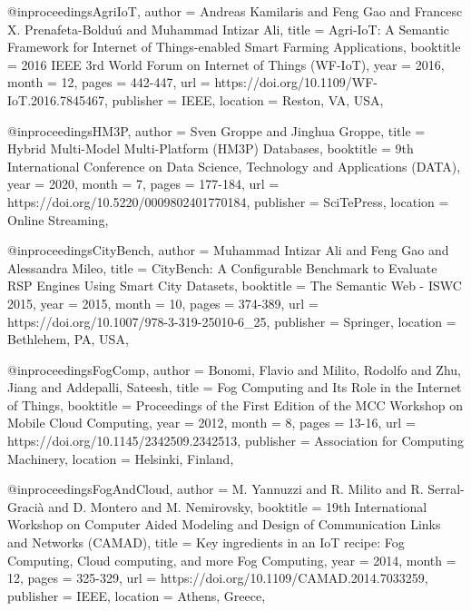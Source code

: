 \documentclass[english,version-2019-11]{uzl-thesis}
\begin{document}
\begin{bibtex-entries}


@inproceedings{AgriIoT,
    author      = {Andreas Kamilaris and Feng Gao and Francesc X. Prenafeta-Boldu\'{u} and Muhammad Intizar Ali},
    title       = {Agri-IoT: A Semantic Framework for Internet of Things-enabled Smart Farming Applications},
    booktitle   = {2016 IEEE 3rd World Forum on Internet of Things (WF-IoT)}, 
    year        = {2016},
    month       = {12},
    pages       = {442-447},
    url         = {https://doi.org/10.1109/WF-IoT.2016.7845467},
    publisher   = {IEEE},
    location    = {Reston, VA, USA},
}    
    
@inproceedings{HM3P,
    author      = {Sven Groppe and Jinghua Groppe},
    title       = {Hybrid Multi-Model Multi-Platform (HM3P) Databases},
    booktitle   = {9th International Conference on Data Science, Technology and Applications ({DATA})},
    year        = {2020},
    month       = {7},
    pages       = {177-184},
    url         = {https://doi.org/10.5220/0009802401770184},
    publisher   = {SciTePress},
    location    = {Online Streaming},
}

@inproceedings{CityBench,
    author      = {Muhammad Intizar Ali and Feng Gao and Alessandra Mileo},
    title       = {CityBench: A Configurable Benchmark to Evaluate RSP Engines Using Smart City Datasets},
    booktitle   = {The Semantic Web - ISWC 2015},
    year        = {2015},
    month       = {10},
    pages       = {374-389},
    url         = {https://doi.org/10.1007/978-3-319-25010-6_25},
    publisher   = {Springer},
    location    = {Bethlehem, PA, USA},
}

@inproceedings{FogComp,
    author      = {Bonomi, Flavio and Milito, Rodolfo and Zhu, Jiang and Addepalli, Sateesh},
    title       = {Fog Computing and Its Role in the Internet of Things},
    booktitle   = {Proceedings of the First Edition of the MCC Workshop on Mobile Cloud Computing},
    year        = {2012},
    month       = {8},
    pages       = {13-16},
    url         = {https://doi.org/10.1145/2342509.2342513},
    publisher   = {Association for Computing Machinery},
    location    = {Helsinki, Finland},
}

@inproceedings{FogAndCloud,
    author      = {M. {Yannuzzi} and R. {Milito} and R. {Serral-Gracià} and D. {Montero} and M. {Nemirovsky}},
    booktitle   = {19th International Workshop on Computer Aided Modeling and Design of Communication Links and Networks (CAMAD)},
    title       = {Key ingredients in an IoT recipe: Fog Computing, Cloud computing, and more Fog Computing},
    year        = {2014},
    month       = {12},
    pages       = {325-329},
    url         = {https://doi.org/10.1109/CAMAD.2014.7033259},
    publisher   = {IEEE},
    location    = {Athens, Greece},
}


\end{bibtex-entries}
\end{document}
